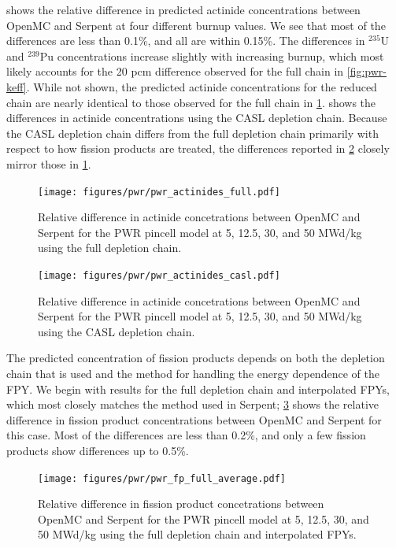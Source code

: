 \documentclass[3p,authoryear]{elsarticle}
\begin{document}
 shows the relative difference in predicted
actinide concentrations between OpenMC and Serpent at four different burnup
values. We see that most of the differences are less than 0.1\%, and all are
within 0.15\%. The differences in $^{235}$U and $^{239}$Pu concentrations
increase slightly with increasing burnup, which most likely accounts for the 20
pcm difference observed for the full chain in \cref{fig:pwr-keff}. While not
shown, the predicted actinide concentrations for the reduced chain are nearly
identical to those observed for the full chain in \cref{fig:pwr-actinides-full}.
 shows the differences in actinide concentrations
using the CASL depletion chain. Because the CASL depletion chain differs from
the full depletion chain primarily with respect to how fission products are
treated, the differences reported in \cref{fig:pwr-actinides-casl} closely
mirror those in \cref{fig:pwr-actinides-full}.
\begin{figure}[H]
  \centering
  \texttt{[image: figures/pwr/pwr\_actinides\_full.pdf]}
  \caption{Relative difference in actinide concetrations between OpenMC and
  Serpent for the PWR pincell model at 5, 12.5, 30, and 50 MWd/kg using the full
  depletion chain.}
  \label{fig:pwr-actinides-full}
\end{figure}
\begin{figure}[H]
  \centering
  \texttt{[image: figures/pwr/pwr\_actinides\_casl.pdf]}
  \caption{Relative difference in actinide concetrations between OpenMC and
  Serpent for the PWR pincell model at 5, 12.5, 30, and 50 MWd/kg using the CASL
  depletion chain.}
  \label{fig:pwr-actinides-casl}
\end{figure}

The predicted concentration of fission products depends on both the depletion
chain that is used and the method for handling the energy dependence of the FPY.
We begin with results for the full depletion chain and interpolated FPYs, which
most closely matches the method used in Serpent; \cref{fig:pwr-fp-full-average}
shows the relative difference in fission product concentrations between OpenMC
and Serpent for this case. Most of the differences are less than 0.2\%, and only
a few fission products show differences up to 0.5\%.
\begin{figure}[H]
  \centering
  \texttt{[image: figures/pwr/pwr\_fp\_full\_average.pdf]}
  \caption{Relative difference in fission product concetrations between OpenMC
  and Serpent for the PWR pincell model at 5, 12.5, 30, and 50 MWd/kg using the
  full depletion chain and interpolated FPYs.}
  \label{fig:pwr-fp-full-average}
\end{figure}
\end{document}
